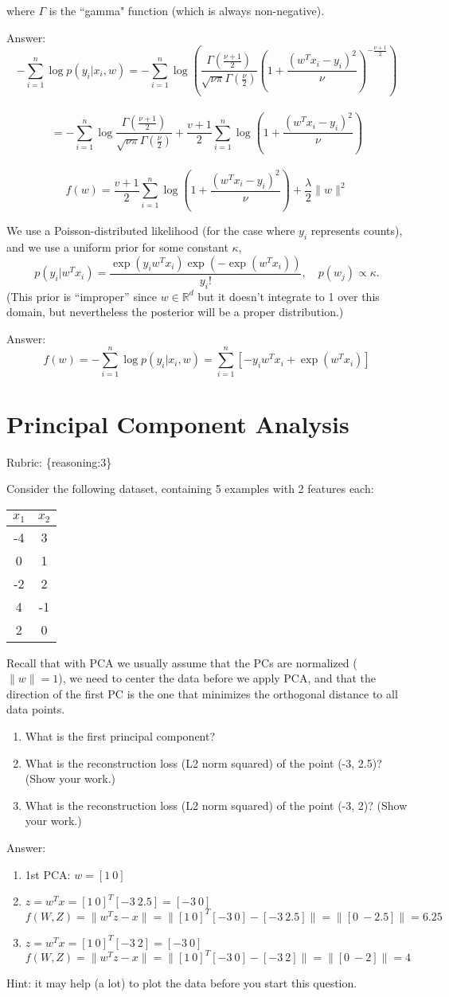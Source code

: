 \documentclass{article}
\def\rubric#1{\gre{Rubric: \{#1\}}}{}
\def\ans#1{\par\gre{Answer: #1}}
\def\blu#1{{\color{blu}#1}}
\def\gre#1{{\color{gre}#1}}
\def\norm#1{\|#1\|}
\def\R{\mathbb{R}}
\def\enum#1{\begin{enumerate}#1\end{enumerate}}
\begin{document}
{\[\]
where $\Gamma$ is the ``gamma" function (which is always non-negative).
\ans{
\[ -\sum_{i=1}^n\log p(y_i | x_i, w) = -\sum_{i=1}^n\log(\frac{\Gamma\left(\frac{\nu + 1}{2}\right)}{\sqrt{\nu\pi}\Gamma\left(\frac \nu 2\right)}\left(1 + \frac{(w^Tx_i - y_i)^2}{\nu}\right)^{-\frac{\nu+1}{2}} ) \]\\
\[= -\sum_{i=1}^n\log \frac{\Gamma\left(\frac{\nu + 1}{2}\right)}{\sqrt{\nu\pi}\Gamma\left(\frac \nu 2\right)} + \frac{v+1}{2} \sum_{i=1}^n \log\left(1 + \frac{(w^Tx_i - y_i)^2}{\nu}\right) \]\\
 \[ f(w) = \frac{v+1}{2} \sum_{i=1}^n \log\left(1 + \frac{(w^Tx_i - y_i)^2}{\nu}\right) + \frac \lambda  2 \norm{w}^2\]}
\item We use a Poisson-distributed likelihood (for the case where $y_i$ represents counts), and we use a uniform prior for some constant $\kappa$,
\[
p(y_i | w^Tx_i) = \frac{\exp(y_iw^Tx_i)\exp(-\exp(w^Tx_i))}{y_i!}, \quad p(w_j) \propto \kappa.
\]
(This prior is 	``improper'' since $w\in\R^d$ but it doesn't integrate to 1 over this domain, but nevertheless the posterior will be a proper distribution.)
\ans{
	\[ f(w) = -\sum_{i=1}^n\log p(y_i | x_i, w)=\sum_{i=1}^n [-y_iw^Tx_i +\exp(w^Tx_i)]\]}
}


\section{Principal Component Analysis}
\rubric{reasoning:3}


Consider the following dataset, containing 5 examples with 2 features each:
\begin{center}
\begin{tabular}{cc}
$x_1$ & $x_2$\\
\hline
-4 & 3\\
0 & 1\\
-2 & 2\\
4 & -1\\
2 & 0\\
\end{tabular}
\end{center}
Recall that with PCA we usually assume that the PCs are normalized ($\norm{w} = 1$), we need to center the data before we apply PCA, and that the direction of the first PC is the one that minimizes the orthogonal distance to all data points.
\blu{
\enum{
\item What is the first principal component?
\item What is the reconstruction loss (L2 norm squared) of the point (-3, 2.5)? (Show your work.)
\item What is the reconstruction loss (L2 norm squared) of the point (-3, 2)? (Show your work.)
}
}
\ans{
	\enum{
\item 1st PCA: $w = [1 \ 0]$
\item $z=w^Tx=[1 \ 0]^T[-3 \ 2.5]=[-3 \ 0]$
$f(W,Z)=\norm{w^Tz-x}=\norm{[1 \ 0]^T[-3 \ 0]-[-3 \ 2.5]}=\norm{[0 \ -2.5]}=6.25$
\item $z=w^Tx=[1 \ 0]^T[-3 \ 2]=[-3 \ 0]$
$f(W,Z)=\norm{w^Tz-x}=\norm{[1 \ 0]^T[-3 \ 0]-[-3 \ 2]}=\norm{[0 \ -2]}=4$
}
}
Hint: it may help (a lot) to plot the data before you start this question.
\end{document}
